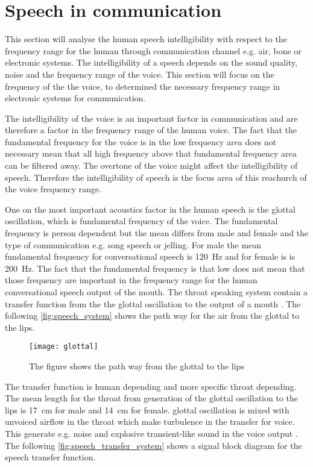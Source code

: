 \section{Speech in communication}

This section will analyse the human speech intelligibility with respect to the frequency range for the human through communication channel e.g. air, bone or electronic systems. The intelligibility of a speech depends on the sound quality, noise and the frequency range of the voice. This section will focus on the frequency of the the voice, to determined the necessary frequency range in electronic systems for communication. 

The intelligibility of the voice is an important factor in communication and are therefore a factor in the frequency range of the human voice. The fact that the fundamental frequency for the voice is in the low frequency area does not necessary mean that all high frequency above that fundamental frequency area can be filtered away. The overtone of the voice might affect the intelligibility of speech. Therefore the intelligibility of speech is the focus area of this reachurch of the voice frequency range. 

One on the most important acoustics factor in the human speech is the glottal oscillation, which is fundamental frequency of the voice. The fundamental frequency is person dependent but the mean differs from male and female and the type of communication e.g. song speech or jelling. For male the mean fundamental frequency for conversational speech is \SI{120}{\hertz} and for female is is \SI{200}{\hertz}. The fact that the fundamental frequency is that low does not mean that those frequency are important in the frequency range for the human conversational speech output of the mouth. The throat speaking system contain a transfer function from the the glottal oscillation to the output of a mouth \citep{pulkki2015}. The following \autoref{fig:speech_system} shows the path way for the air from the glottal to the lips.


 \begin{figure}[H]
	\centering
		\texttt{[image: glottal]}
		\caption{The figure shows the path way from the glottal to the lips \citep{pulkki2015}}
		\label{fig:speech_system}
\end{figure}

The transfer function is human depending and more specific throat depending. The mean length for the throat from generation of the glottal oscillation to the lips is \SI{17}{\centi\meter} for male and \SI{14}{\centi\meter} for female. glottal oscillation is mixed with unvoiced airflow in the throat which make turbulence in the transfer for voice. This generate e.g. noise and explosive transient-like sound in the voice output \citep{pulkki2015}. The following \autoref{fig:speech_transfer_system} shows a signal block diagram for the speech transfer function.

